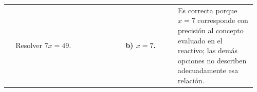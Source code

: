 \documentclass[
	spanish,
	letterpaper, oneside
]{article}
\begin{document}
\begin{landscape}
\begin{longtable}{@{}>{\centering\arraybackslash}p{0.035\linewidth}>{\raggedright\arraybackslash}p{0.42\linewidth}>{\raggedright\arraybackslash}p{0.20\linewidth}>{\raggedright\arraybackslash}p{0.30\linewidth}@{}}
\midrule
30 & Resolver $7x=49$. & \textbf{b) $x=7$.} & Es correcta porque $x=7$ corresponde con precisión al concepto evaluado en el reactivo; las demás opciones no describen adecuadamente esa relación. \\
\end{longtable}
\endgroup
\end{landscape}
\pagestyle{fancy}
\clearpage


%
\end{document}
